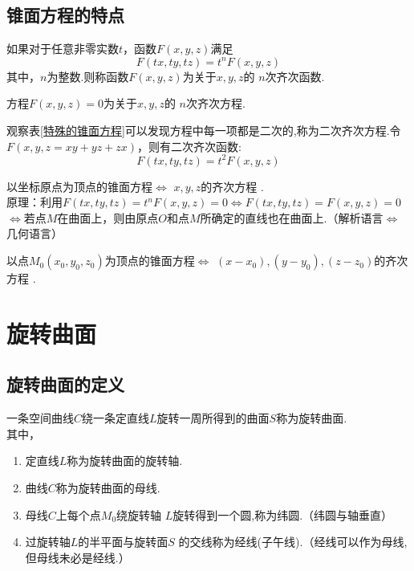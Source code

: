 \subsection{锥面方程的特点}
\tdefination[齐次方程]
如果对于任意非零实数$t$，函数$F(x,y,z)$满足
\begin{equation}
F(tx,ty,tz)=t^nF(x,y,z)
\end{equation}
其中，$n$为整数.则称函数$F(x,y,z)$为关于$x,y,z$的{\color{dy}$\, \,  n$次齐次函数}.
\par 方程$F(x,y,z)=0$为关于$x,y,z$的{\color{dy}$\, \,  n$次齐次方程}.
	\par 观察表\ref{特殊的锥面方程}可以发现方程中每一项都是二次的,称为二次齐次方程.令$F(x,y,z=xy+yz+zx)$，则有二次齐次函数:
	$$
	F(tx,ty,tz)=t^2F(x,y,z)
	$$
	
	\theorem[原点为顶点的锥面方程的特点]
	以坐标原点为顶点的锥面方程$\Longleftrightarrow$ $x, y, z$的齐次方程 .\\
原理：利用$F(tx,ty,tz)=t^nF(x,y,z)=0 \Longleftrightarrow  F(tx,ty,tz)=F(x,y,z)=0$
\\$ \Longleftrightarrow$若点$M$在曲面上，则由原点$O$和点$M$所确定的直线也在曲面上.\colorbox{文字底色}{（解析语言$\Longleftrightarrow$几何语言）}

	\addinference[一般锥面方程的特点]
以点$M_0(x_0,y_0,z_0)$为顶点的锥面方程$\Longleftrightarrow$ $(x-x_0), (y-y_0), (z-z_0)$的齐次方程 .\\

\section{旋转曲面}\label{旋转曲面}
\subsection{旋转曲面的定义}
\tdefination[旋转曲面]
一条空间曲线$C$绕一条定直线$L$旋转一周所得到的曲面$S$称为{\color{dy}旋转曲面}.
\\其中，
\begin{enumerate}[]
	\setlength{\itemindent}{2em}
	\setlength{\topsep}{0.01em}
	\setlength{\itemsep}{0.01em}
	\item 定直线$L$称为旋转曲面的{\color{dy}旋转轴}.
	\item 曲线$C$称为旋转曲面的{\color{dy}母线}.
	\item 母线$C$上每个点$M_0$绕旋转轴 $L$旋转得到一个圆,称为{\color{dy}纬圆}.（纬圆与轴垂直）
	\item 过旋转轴$L$的半平面与旋转面$S$ 的交线称为{\color{dy}经线}({\color{dy}子午线}).（经线可以作为母线,但母线未必是经线.）
\end{enumerate}

